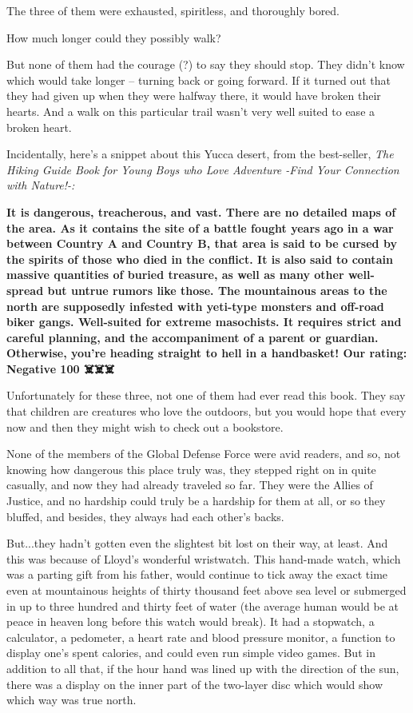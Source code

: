 \documentclass[
]{article}
\begin{document}
The three of them were exhausted, spiritless, and thoroughly bored.

How much longer could they possibly walk?

But none of them had the courage (?) to say they should stop. They
didn't know which would take longer -- turning back or going forward. If
it turned out that they had given up when they were halfway there, it
would have broken their hearts. And a walk on this particular trail
wasn't very well suited to ease a broken heart.

Incidentally, here's a snippet about this Yucca desert, from the
best-seller, \emph{The Hiking Guide Book for Young Boys who Love
Adventure -Find Your Connection with Nature!-:}

\textbf{It is dangerous, treacherous, and vast. There are no detailed
maps of the area. As it contains the site of a battle fought years ago
in a war between Country A and Country B, that area is said to be cursed
by the spirits of those who died in the conflict. It is also said to
contain massive quantities of buried treasure, as well as many other
well-spread but untrue rumors like those. The mountainous areas to the
north are supposedly infested with yeti-type monsters and off-road biker
gangs. Well-suited for extreme masochists. It requires strict and
careful planning, and the accompaniment of a parent or guardian.
Otherwise, you're heading straight to hell in a handbasket! Our rating:
Negative 100 ☠️☠️☠️}

Unfortunately for these three, not one of them had ever read this book.
They say that children are creatures who love the outdoors, but you
would hope that every now and then they might wish to check out a
bookstore.

None of the members of the Global Defense Force were avid readers, and
so, not knowing how dangerous this place truly was, they stepped right
on in quite casually, and now they had already traveled so far. They
were the Allies of Justice, and no hardship could truly be a hardship
for them at all, or so they bluffed, and besides, they always had each
other's backs.

But...they hadn't gotten even the slightest bit lost on their way, at
least. And this was because of Lloyd's wonderful wristwatch. This
hand-made watch, which was a parting gift from his father, would
continue to tick away the exact time even at mountainous heights of
thirty thousand feet above sea level or submerged in up to three hundred
and thirty feet of water (the average human would be at peace in heaven
long before this watch would break). It had a stopwatch, a calculator, a
pedometer, a heart rate and blood pressure monitor, a function to
display one's spent calories, and could even run simple video games. But
in addition to all that, if the hour hand was lined up with the
direction of the sun, there was a display on the inner part of the
two-layer disc which would show which way was true north.
\end{document}

